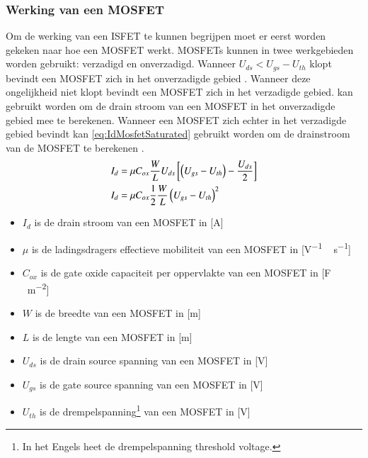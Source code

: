 \subsubsection{Werking van een MOSFET}
Om de werking van een ISFET te kunnen begrijpen moet er eerst worden gekeken naar hoe een MOSFET werkt.
MOSFETs kunnen in twee werkgebieden worden gebruikt: verzadigd en onverzadigd. Wanneer $U_{ds}<U_{gs}-U_{th}$ klopt bevindt een MOSFET zich in het onverzadigde gebied \cite{bergveld1985impactOfMosfetBasedSensors,inleidingInDeElektronicaWissenburgh}. Wanneer deze ongelijkheid niet klopt bevindt een MOSFET zich in het verzadigde gebied.  kan gebruikt worden om de drain stroom van een MOSFET in het onverzadigde gebied mee te berekenen. Wanneer een MOSFET zich echter in het verzadigde gebied bevindt kan \cref{eq:IdMosfetSaturated} gebruikt worden om de drainstroom van de MOSFET te berekenen \cite{elbasfun,inleidingInDeElektronicaWissenburgh,bergveld1985impactOfMosfetBasedSensors,isfetAsAnElectronicDevice,DonaldNeamenSemiconductorPhysicsAndDevicesBasicPrinciples}.
\begin{align}
    I_d{}&={}\mu C_{ox}\frac{W}{L}U_{ds}\left[\left(U_{gs}-U_{th}\right)-\frac{U_{ds}}{2}\right]
    \tagaddtext{[\si{\ampere}]} \label{eq:IdMosfetUnsaturated}\\
    I_d{}&={}\mu C_{ox}\frac{1}{2}\frac{W}{L}\left(U_{gs}-U_{th}\right)^2
    \tagaddtext{[\si{\ampere}]} \label{eq:IdMosfetSaturated}
\end{align}
\begin{itemize}
    \item $I_d$ is de drain stroom van een MOSFET in [\si{\ampere}]
    \item $\mu$ is de ladingsdragers effectieve mobiliteit van een MOSFET in [\si{\volt^{-1}\,\second^{-1}}]
    \item $C_{ox}$ is de gate oxide capaciteit per oppervlakte van een MOSFET in [\si{\farad\,\meter^{-2}}]
    \item $W$ is de breedte van een MOSFET in [\si{\meter}]
    \item $L$ is de lengte van een MOSFET in [\si{\meter}]
    \item $U_{ds}$ is de drain source spanning van een MOSFET in [\si{\volt}]
    \item $U_{gs}$ is de gate source spanning van een MOSFET in [\si{\volt}]
    \item $U_{th}$ is de drempelspanning\footnote{In het Engels heet de drempelspanning threshold voltage.} van een MOSFET in [\si{\volt}]
\end{itemize}

